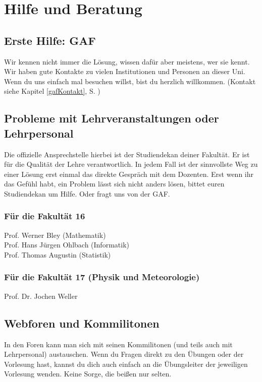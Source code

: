 ﻿\chapter{Hilfe und Beratung}

\section{Erste Hilfe: GAF}

Wir kennen nicht immer die Lösung, wissen dafür aber meistens, wer sie
kennt. Wir haben gute Kontakte zu vielen Institutionen und Personen an
dieser Uni. Wenn du uns einfach mal besuchen willst, bist du herzlich
willkommen. (Kontakt siehe Kapitel \ref{gafKontakt}, S. \pageref{gafKontakt})

\section{Probleme mit Lehrveranstaltungen oder Lehrpersonal}

Die offizielle Ansprechstelle hierbei ist der Studiendekan deiner
Fakultät. Er ist für die Qualität der Lehre verantwortlich. In jedem
Fall ist der sinnvollste Weg zu einer Lösung erst einmal das direkte
Gespräch mit dem Dozenten. Erst wenn ihr das Gefühl habt, ein Problem
lässt sich nicht anders lösen, bittet euren Studiendekan um
Hilfe. Oder fragt uns von der GAF.

\subsection*{Für die Fakultät 16}
Prof. Werner Bley (Mathematik)\\ %
Prof. Hans Jürgen Ohlbach (Informatik)\\
Prof. Thomas Augustin (Statistik)%

\subsection*{Für die Fakultät 17 (Physik und Meteorologie)}
Prof. Dr. Jochen Weller

\section{Webforen und Kommilitonen}

In den Foren kann man sich mit seinen Kommilitonen
(und teils auch mit Lehrpersonal) austauschen. Wenn du Fragen direkt zu den
Übungen oder der Vorlesung hast, kannst du dich auch einfach an die
Übungsleiter der jeweiligen Vorlesung wenden. Keine Sorge, die beißen nur
selten.\\

